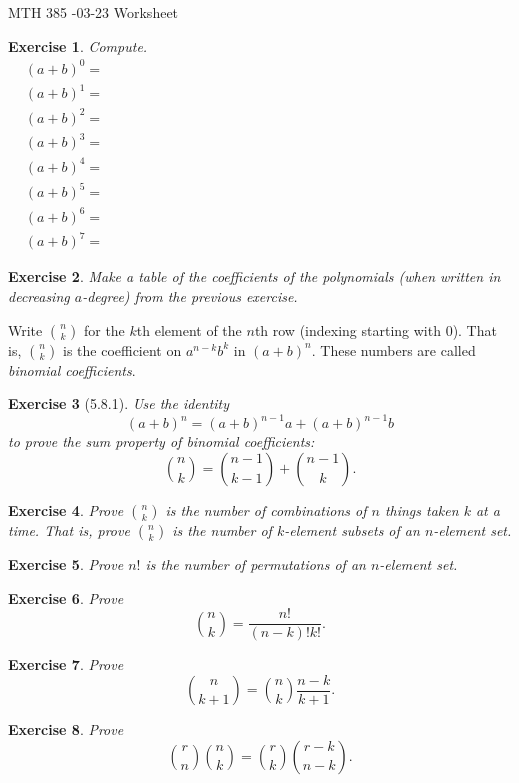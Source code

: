 \documentclass[12pt]{article}
\theoremstyle{plain}
\newtheorem{ex}{Exercise}
\begin{document}
MTH 385 -03-23 Worksheet

\begin{ex}
  Compute.
  \begin{align*}
    & (a+b)^0 = \hspace{5in} \\
    & (a+b)^1 =  \\
    & (a+b)^2 =  \\
    & (a+b)^3 =  \\
    & (a+b)^4 =  \\
    & (a+b)^5 =  \\
    & (a+b)^6 =  \\
    & (a+b)^7 =
  \end{align*}
\end{ex}

\begin{ex}
  Make a table of the coefficients of the polynomials (when written in decreasing $a$-degree) from the previous exercise.
\end{ex}

Write $\binom{n}{k}$ for the $k$th element of the $n$th row (indexing starting with $0$). That is, $\binom{n}{k}$ is the coefficient on $a^{n-k}b^k$ in $(a+b)^n$. These numbers are called \emph{binomial coefficients}.

\begin{ex} [5.8.1]
  Use the identity
  \[
    (a+b)^n=(a+b)^{n-1}a+(a+b)^{n-1}b
  \]
  to prove the sum property of binomial coefficients:
  \[
    \binom{n}{k}=\binom{n-1}{k-1}+\binom{n-1}{k}.
  \]
\end{ex}

\begin{ex}
  Prove $\binom{n}{k}$ is the number of combinations of $n$ things taken $k$ at a time. That is, prove $\binom{n}{k}$ is the number of $k$-element subsets of an $n$-element set.
\end{ex}

\begin{ex}
  Prove $n!$ is the number of permutations of an $n$-element set.
\end{ex}

\begin{ex}
  Prove
  \[
    \binom{n}{k}=\frac{n!}{(n-k)!k!}.
  \]
\end{ex}

\begin{ex}
  Prove
  \[
    \binom{n}{k+1}=\binom{n}{k}\frac{n-k}{k+1}.
  \]
\end{ex}

\begin{ex}
  Prove
  \[
    \binom{r}{n}\binom{n}{k}=\binom{r}{k}\binom{r-k}{n-k}.
  \]
\end{ex}
\end{document}

